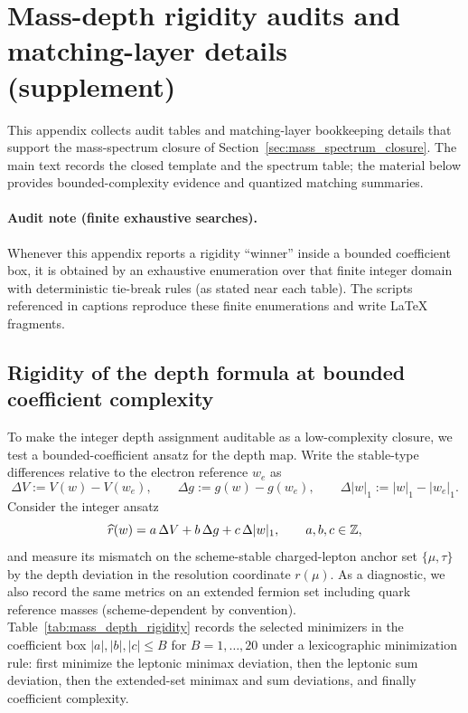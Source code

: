 \section{Mass-depth rigidity audits and matching-layer details (supplement)}
\label{app:mass_rigidity_details}

This appendix collects audit tables and matching-layer bookkeeping details that support the mass-spectrum closure of Section~\ref{sec:mass_spectrum_closure}.
The main text records the closed template and the spectrum table; the material below provides bounded-complexity evidence and quantized matching summaries.

\paragraph{Audit note (finite exhaustive searches).}
Whenever this appendix reports a rigidity ``winner'' inside a bounded coefficient box, it is obtained by an exhaustive enumeration over that finite integer domain with deterministic tie-break rules (as stated near each table).
The scripts referenced in captions reproduce these finite enumerations and write \LaTeX{} fragments.

\subsection{Rigidity of the depth formula at bounded coefficient complexity}
\label{subsec:mass_depth_rigidity}

To make the integer depth assignment auditable as a low-complexity closure, we test a bounded-coefficient ansatz for the depth map.
Write the stable-type differences relative to the electron reference $w_e$ as
\[
\Delta V:=V(w)-V(w_e),\qquad \Delta g:=g(w)-g(w_e),\qquad \Delta|w|_1:=|w|_1-|w_e|_1.
\]
Consider the integer ansatz
\begin{equation}\label{eq:rhat_abc_ansatz}
\widehat r(w)=a\,\Delta V+b\,\Delta g+c\,\Delta|w|_1,
\qquad a,b,c\in\mathbb{Z},
\end{equation}
and measure its mismatch on the scheme-stable charged-lepton anchor set $\{\mu,\tau\}$ by the depth deviation in the resolution coordinate $r(\mu)$.
As a diagnostic, we also record the same metrics on an extended fermion set including quark reference masses (scheme-dependent by convention).
Table~\ref{tab:mass_depth_rigidity} records the selected minimizers in the coefficient box $|a|,|b|,|c|\le B$ for $B=1,\dots,20$ under a lexicographic minimization rule: first minimize the leptonic minimax deviation, then the leptonic sum deviation, then the extended-set minimax and sum deviations, and finally coefficient complexity.

